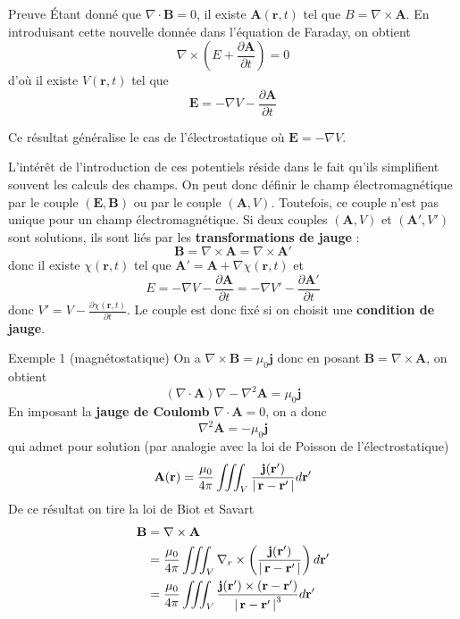         \begin{demo}{Preuve}
            Étant donné que $\nabla \cdot \mathbf{B} = 0$, il existe $\mathbf{A}(\mathbf{r},t)$ tel que $B = \nabla \times \mathbf{A}$. En introduisant cette nouvelle donnée dans l’équation de Faraday, on obtient 
            \[ \nabla \times \left(E + \frac{\partial \mathbf{A}}{\partial t} \right) = 0 \]   
            d’où il existe $V(\mathbf{r},t)$ tel que 
            \[ \mathbf{E} = - \nabla V - \frac{\partial \mathbf{A}}{\partial t} \]  
        \end{demo}

        Ce résultat généralise le cas de l’électrostatique où $\mathbf{E} = - \nabla V$. 

        L’intérêt de l’introduction de ces potentiels réside dans le fait qu’ils simplifient souvent les calculs des champs. On peut donc définir le champ électromagnétique par le couple $(\mathbf{E}, \mathbf{B})$ ou par le couple $(\mathbf{A}, V)$. Toutefois, ce couple n’est pas unique pour un champ électromagnétique. Si deux couples $(\mathbf{A}, V)$ et $(\mathbf{A}', V')$ sont solutions, ils sont liés par les \textbf{transformations de jauge} :  \[ \mathbf{B} = \nabla \times \mathbf{A} = \nabla \times \mathbf{A}' \] 
        donc il existe $\chi(\mathbf{r},t)$ tel que $\mathbf{A}' = \mathbf{A} + \nabla \chi(\mathbf{r},t)$ et 
        \[ E = - \nabla V - \frac{\partial \mathbf{A}}{\partial t} = - \nabla V' - \frac{\partial \mathbf{A}'}{\partial t}  \]   
        donc $V' = V - \frac{\partial \chi(\mathbf{r},t)}{\partial t}$. Le couple est donc fixé si on choisit une \textbf{condition de jauge}.

        \begin{demo}{Exemple 1 (magnétostatique)}
            On a $\nabla \times \mathbf{B} = \mu_0 \mathbf{j}$ donc en posant $\mathbf{B} = \nabla \times \mathbf{A}$, on obtient 
            \[ (\nabla \cdot \mathbf{A}) \nabla - \nabla^2 \mathbf{A} = \mu_0 \mathbf{j} \]   
            En imposant la \textbf{jauge de Coulomb} $\nabla \cdot \mathbf{A} = 0$, on a donc 
            \[ \nabla^2 \mathbf{A} = - \mu_0 \mathbf{j} \]   
            qui admet pour solution (par analogie avec la loi de Poisson de l’électrostatique)
            \[ \mathbf{A}(\mathbf{r}) = \frac{\mu_0}{4 \pi} \iiint_V \frac{\mathbf{j}(\mathbf{r}')}{\left\lvert \, \mathbf{r} - \mathbf{r}' \, \right\rvert} d\mathbf{r}' \]    
            De ce résultat on tire la loi de Biot et Savart 
            \begin{align*}
                \mathbf{B} 
                &= \nabla \times \mathbf{A} \\
                &= \frac{\mu_0}{4 \pi} \iiint_V \nabla_r \times \left(\frac{\mathbf{j}(\mathbf{r}')}{\left\lvert \, \mathbf{r} - \mathbf{r}' \, \right\rvert}\right) d\mathbf{r}' \\
                &= \frac{\mu_0}{4 \pi} \iiint_V  \frac{\mathbf{j}(\mathbf{r}') \times (\mathbf{r} - \mathbf{r}')}{\left\lvert \, \mathbf{r} - \mathbf{r}' \, \right\rvert^3} d\mathbf{r}'
            \end{align*}
        \end{demo}

